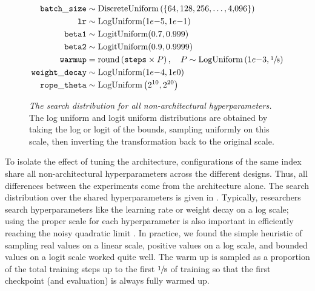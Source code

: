\begin{figure}
    \centering
    \begin{align*}
        \mathtt{batch\_size}   &\sim \operatorname{DiscreteUniform}\left(\{64, 128, 256, \ldots, 4{,}096\}\right) \\
        \mathtt{lr}            &\sim \operatorname{LogUniform}(1e{-}5, 1e{-1}) \\
        \mathtt{beta1}         &\sim \operatorname{LogitUniform}(0.7, 0.999) \\
        \mathtt{beta2}         &\sim \operatorname{LogitUniform}(0.9, 0.9999) \\
        \mathtt{warmup}        &= \operatorname{round}\left(\mathtt{steps} \times P\right),\quad P \sim \operatorname{LogUniform}\left(1e{-}3, \sfrac{1}{8}\right) \\
        \mathtt{weight\_decay} &\sim \operatorname{LogUniform}(1e{-}4, 1e0) \\
        \mathtt{rope\_theta}   &\sim \operatorname{LogUniform}\left(2^{10}, 2^{20}\right) \\
    \end{align*}
    \caption{
        \emph{The search distribution for all non-architectural hyperparameters.} The log uniform and logit uniform distributions are obtained by taking the log or logit of the bounds, sampling uniformly on this scale, then inverting the transformation back to the original scale.
    }
    \label{fig:search-distribution_non-architectural}
\end{figure}

To isolate the effect of tuning the architecture, configurations of the same index share all non-architectural hyperparameters across the different designs. Thus, all differences between the experiments come from the architecture alone. The search distribution over the shared hyperparameters is given in . Typically, researchers search hyperparameters like the learning rate or weight decay on a log scale; using the proper scale for each hyperparameter is also important in efficiently reaching the noisy quadratic limit \citep{lourie2025hyperparameter}. In practice, we found the simple heuristic of sampling real values on a linear scale, positive values on a log scale, and bounded values on a logit scale worked quite well. The warm up is sampled as a proportion of the total training steps up to the first $\sfrac{1}{8}$ of training so that the first checkpoint (and evaluation) is always fully warmed up.

